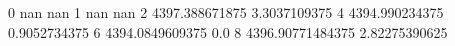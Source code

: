 0 nan nan
1 nan nan
2 4397.388671875 3.3037109375
4 4394.990234375 0.9052734375
6 4394.0849609375 0.0
8 4396.90771484375 2.82275390625
